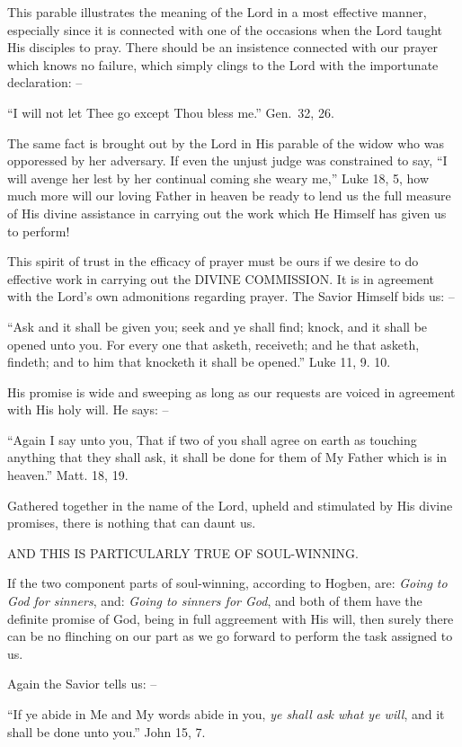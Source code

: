 \documentclass[
]{book}
\begin{document}
This parable illustrates the meaning of the Lord in a most effective manner, especially since it is connected with one of the occasions when the Lord taught His disciples to pray. There should be an insistence connected with our prayer which knows no failure, which simply clings to the Lord with the importunate declaration: --

``I will not let Thee go except Thou bless me.'' Gen.~32, 26.

The same fact is brought out by the Lord in His parable of the widow who was opporessed by her adversary. If even the unjust judge was constrained to say, ``I will avenge her lest by her continual coming she weary me,'' Luke 18, 5, how much more will our loving Father in heaven be ready to lend us the full measure of His divine assistance in carrying out the work which He Himself has given us to perform!

This spirit of trust in the efficacy of prayer must be ours if we desire to do effective work in carrying out the DIVINE COMMISSION. It is in agreement with the Lord's own admonitions regarding prayer. The Savior Himself bids us: --

``Ask and it shall be given you; seek and ye shall find; knock, and it shall be opened unto you. For every one that asketh, receiveth; and he that asketh, findeth; and to him that knocketh it shall be opened.'' Luke 11, 9. 10.

His promise is wide and sweeping as long as our requests are voiced in agreement with His holy will. He says: --

``Again I say unto you, That if two of you shall agree on earth as touching anything that they shall ask, it shall be done for them of My Father which is in heaven.'' Matt. 18, 19.

Gathered together in the name of the Lord, upheld and stimulated by His divine promises, there is nothing that can daunt us.

AND THIS IS PARTICULARLY TRUE OF SOUL-WINNING.

If the two component parts of soul-winning, according to Hogben, are: \emph{Going to God for sinners}, and: \emph{Going to sinners for God}, and both of them have the definite promise of God, being in full aggreement with His will, then surely there can be no flinching on our part as we go forward to perform the task assigned to us.

Again the Savior tells us: --

``If ye abide in Me and My words abide in you, \emph{ye shall ask what ye will}, and it shall be done unto you.'' John 15, 7.
\end{document}
